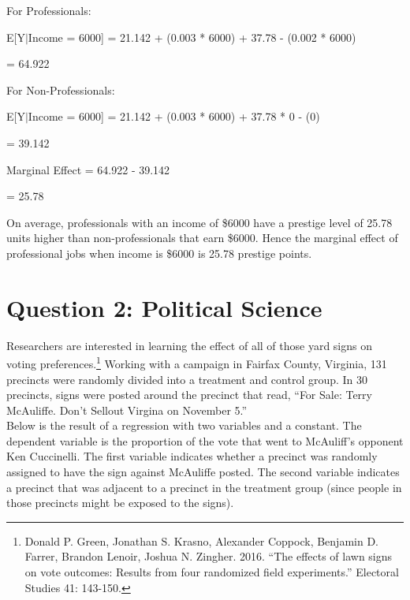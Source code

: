 \documentclass[12pt,letterpaper]{article}
\begin{document}
\begin{enumerate}
	\noindent
	
	For Professionals:
	
	E[Y$|$Income = 6000] = 21.142 + (0.003 * 6000) + 37.78 - (0.002 * 6000)
	
	= 64.922
	\vspace*{0.5cm}
	
	For Non-Professionals:
	
	E[Y$|$Income = 6000] = 21.142 + (0.003 * 6000) + 37.78 * 0 - (0)
	
	= 39.142
	
	\vspace*{0.5cm}
	Marginal Effect = 64.922 - 39.142
	
	= 25.78
	
	\vspace*{0.5cm}
	On average, professionals with an income of \$6000 have a prestige level of 25.78 units higher than non-professionals that earn \$6000. Hence the marginal effect of professional jobs when income is \$6000 is 25.78
	prestige points.
	
\end{enumerate}

\newpage

\section*{Question 2: Political Science}
\vspace{.25cm}
\noindent 	Researchers are interested in learning the effect of all of those yard signs on voting preferences.\footnote{Donald P. Green, Jonathan	S. Krasno, Alexander Coppock, Benjamin D. Farrer,	Brandon Lenoir, Joshua N. Zingher. 2016. ``The effects of lawn signs on vote outcomes: Results from four randomized field experiments.'' Electoral Studies 41: 143-150. } Working with a campaign in Fairfax County, Virginia, 131 precincts were randomly divided into a treatment and control group. In 30 precincts, signs were posted around the precinct that read, ``For Sale: Terry McAuliffe. Don't Sellout Virgina on November 5.'' \\

Below is the result of a regression with two variables and a constant.  The dependent variable is the proportion of the vote that went to McAuliff's opponent Ken Cuccinelli. The first variable indicates whether a precinct was randomly assigned to have the sign against McAuliffe posted. The second variable indicates
a precinct that was adjacent to a precinct in the treatment group (since people in those precincts might be exposed to the signs).  \\
\end{document}
